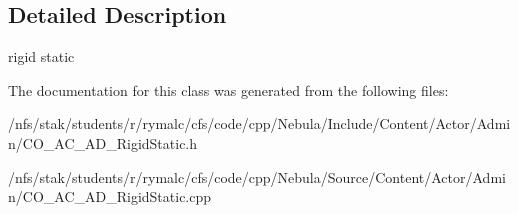 \subsection{Detailed Description}
rigid static 

The documentation for this class was generated from the following files:\begin{DoxyCompactItemize}
\item 
/nfs/stak/students/r/rymalc/cfs/code/cpp/Nebula/Include/Content/Actor/Admin/CO\_\-AC\_\-AD\_\-RigidStatic.h\item 
/nfs/stak/students/r/rymalc/cfs/code/cpp/Nebula/Source/Content/Actor/Admin/CO\_\-AC\_\-AD\_\-RigidStatic.cpp\end{DoxyCompactItemize}
